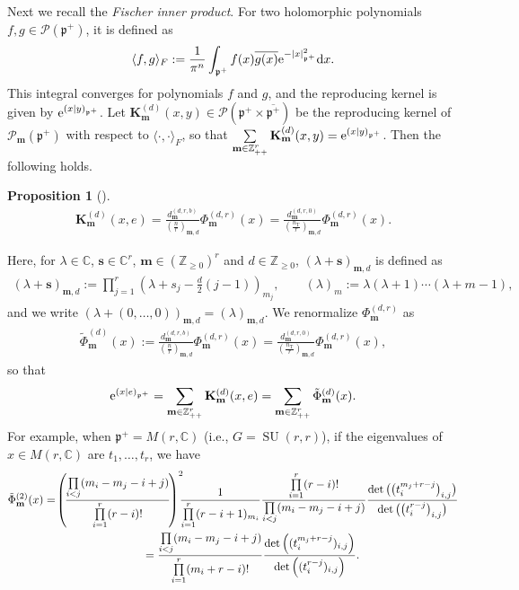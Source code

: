 \documentclass[pdftex]{sigma}
\numberwithin{equation}{section}
\newtheorem{Proposition}[Theorem]{Proposition}
{ \theoremstyle{definition}
\newtheorem{Definition}[Theorem]{Definition}
\newtheorem{Note}[Theorem]{Note}
\newtheorem{Example}[Theorem]{Example}
\newtheorem{Remark}[Theorem]{Remark} }
\newcommand{\bK}{\mathbf{K}}
\newcommand{\bm}{\mathbf{m}}
\newcommand{\bs}{\mathbf{s}}
\newcommand{\BZ}{\mathbb{Z}}
\newcommand{\BC}{\mathbb{C}}
\newcommand{\fp}{\mathfrak{p}}
\newcommand{\cP}{\mathcal{P}}
\newcommand{\rT}{\mathrm{T}}
\begin{document}
Next we recall the \textit{Fischer inner product}.
For two holomorphic polynomials $f,g\in\cP(\fp^+)$, it is defined as
\begin{gather}\label{Fischer}
\langle f,g\rangle_F:=\frac{1}{\pi^n}\int_{\fp^+}f(x)\overline{g(x)} {\rm e}^{-|x|_{\fp^+}^2}{\rm d}x.
\end{gather}
This integral converges for polynomials $f$ and $g$, and the reproducing kernel is given by ${\rm e}^{(x|y)_{\fp^+}}$.
Let $\bK_\bm^{(d)}(x,y)\in\cP(\fp^+\times\overline{\fp^+})$ be the reproducing kernel of $\cP_\bm(\fp^+)$
with respect to $\langle\cdot,\cdot\rangle_F$, so that $\sum\limits_{\bm\in\BZ_{++}^r}\bK_\bm^{(d)}(x,y)={\rm e}^{(x|y)_{\fp^+}}$. Then the following holds.
\begin{Proposition}[{\cite[Part III, Lemma V.3.1(a), Theorem V.3.4]{FKKLR}}]\label{Kmxe}
\begin{gather*} \bK_\bm^{(d)}(x,e)=\frac{d_\bm^{(d,r,b)}}{\left(\frac{n}{r}\right)_{\bm,d}}\Phi_\bm^{(d,r)}(x)
=\frac{d_\bm^{(d,r,0)}}{\left(\frac{n_\rT}{r}\right)_{\bm,d}}\Phi_\bm^{(d,r)}(x). \end{gather*}
\end{Proposition}
Here, for $\lambda\in\BC$, $\bs\in\BC^r$, $\bm\in(\BZ_{\ge 0})^r$ and $d\in\BZ_{\ge 0}$, $(\lambda+\bs)_{\bm,d}$ is defined as
\begin{gather}\label{Pochhammer}
(\lambda+\bs)_{\bm,d}:=\prod_{j=1}^r\left(\lambda+s_j-\frac{d}{2}(j-1)\right)_{m_j},\qquad
(\lambda)_m:=\lambda(\lambda+1)\cdots(\lambda+m-1),
\end{gather}
and we write $(\lambda+(0,\ldots,0))_{\bm,d}=(\lambda)_{\bm,d}$.
We renormalize $\Phi_\bm^{(d,r)}$ as
\begin{gather}\label{Phitilde1}
\tilde{\Phi}_\bm^{(d)}(x):=\frac{d_\bm^{(d,r,b)}}{\left(\frac{n}{r}\right)_{\bm,d}}\Phi_\bm^{(d,r)}(x)
=\frac{d_\bm^{(d,r,0)}}{\left(\frac{n_\rT}{r}\right)_{\bm,d}}\Phi_\bm^{(d,r)}(x),
\end{gather}
so that
\begin{gather*} {\rm e}^{(x|e)_{\fp^+}}=\sum_{\bm\in\BZ_{++}^r}\bK_\bm^{(d)}(x,e)=\sum_{\bm\in\BZ_{++}^r}\tilde{\Phi}_\bm^{(d)}(x). \end{gather*}
For example, when $\fp^+=M(r,\BC)$ (i.e., $G=\operatorname{SU}(r,r)$), if the eigenvalues of $x\in M(r,\BC)$ are $t_1,\ldots,t_r$, we have
\begin{gather}
\tilde{\Phi}_\bm^{(2)}(x) = \!\left(\!\frac{\prod\limits_{i<j}(m_i-m_j-i+j)}{\prod\limits_{i=1}^r (r-i)!}\!\right)^2\!\!\! \frac{1}{\prod\limits_{i=1}^r (r-i+1)_{m_i}}
 \frac{\prod\limits_{i=1}^r (r-i)!}{\prod\limits_{i<j}(m_i-m_j-i+j)}
\frac{\det\big(\big(t_i^{m_j+r-j}\big)_{i,j}\big)}{\det\big(\big(t_i^{r-j}\big)_{i,j}\big)}\notag \\
\hphantom{\tilde{\Phi}_\bm^{(2)}(x)}{} =\frac{\prod\limits_{i<j}(m_i-m_j-i+j)}{\prod\limits_{i=1}^r (m_i+r-i)!}
\frac{\det\left((t_i^{m_j+r-j})_{i,j}\right)}{\det\left((t_i^{r-j})_{i,j}\right)}.\label{Schur}
\end{gather}
\end{document}
